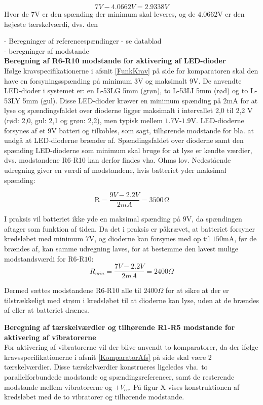 \begin{equation}
7V - 4.0662V = 2.9338V   
\end{equation}
Hvor de $7$V er den spænding der minimum skal leveres, og de $4.0662$V er den højeste tærskelværdi, dvs. den 


- Beregninger af referencespændinger - se datablad \\
- beregninger af modstande \\


\noindent\textbf{Beregning af R6-R10 modstande for aktivering af LED-dioder} \\
Ifølge kravspecifikationerne i afsnit \ref{FunkKrav}  på side \pageref{FunkKrav} for komparatoren skal den have en forsyningsspænding på minimum 3V og maksimalt 9V. De anvendte LED-dioder i systemet er: en L-53LG 5mm (grøn), to L-53LI 5mm (rød) og to L-53LY 5mm (gul). Disse LED-dioder kræver en minimum spænding på 2mA for at lyse og spændingsfaldet over dioderne ligger maksimalt i intervallet 2,0 til 2,2 V (rød: 2,0, gul: 2,1 og grøn: 2,2), men typisk mellem $1.7$V-$1.9$V. LED-dioderne forsynes af et 9V batteri og tilkobles, som sagt, tilhørende modstande for bla. at undgå at LED-dioderne brænder af. Spændingsfaldet over dioderne samt den spænding LED-dioderne som minimum skal bruge for at lyse er kendte værdier, dvs. modstandene R6-R10 kan derfor findes vha. Ohms lov. Nedestående udregning giver en værdi af modstandene, hvis batteriet yder maksimal spænding:

\begin{equation}
\text{R} = \dfrac{9V - 2.2V}{2mA} = 3500\Omega
\end{equation}

\noindent I praksis vil batteriet ikke yde en maksimal spænding på $9$V, da spændingen aftager som funktion af tiden. Da det i praksis er påkrævet, at batteriet forsyner kredsløbet med minimum $7$V, og dioderne kan forsynes med op til $150$mA, før de brændes af, kan samme udregning laves, for at bestemme den lavest mulige modstandsværdi for R$6$-R$10$:
\begin{equation}
R_{min} = \dfrac{7V-2.2V}{2mA} = 2400\Omega
\end{equation}

\noindent Dermed sættes modstandene R$6$-R$10$ alle til $2400\Omega$ for at sikre at der er tilstrækkeligt med strøm i kredsløbet til at dioderne kan lyse, uden at de brændes af eller at batteriet drænes. 

\noindent\textbf{Beregning af tærskelværdier og tilhørende R1-R5 modstande for aktivering af  vibratorerne} \\
For aktivering af vibratorerne vil der blive anvendt to komparatorer, da der ifølge kravsspecifikationerne i afsnit \ref{KomparatorAfs} på side \pageref{KomparatorAfs} skal være 2 tærskelværdier. Disse tærskelværdier konstrueres ligeledes vha. to parallelforbundede modstande og spændingsreferencer, samt de resterende modstande mellem vibratorerne og $+V_{cc}$. På figur X vises konstruktionen af kredsløbet med de to vibratorer og tilhørende modstande. \\

